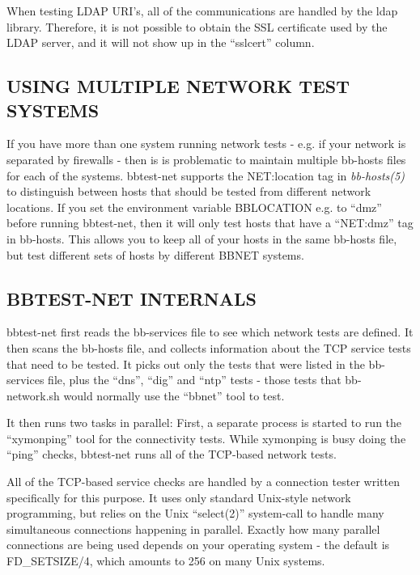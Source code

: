   When testing LDAP URI's, all of the communications are handled by
  the ldap library. Therefore, it is not possible to obtain the SSL
  certificate used by the LDAP server, and it will not show up in the
  ``sslcert'' column. 



 
\subsection{USING MULTIPLE NETWORK TEST SYSTEMS}
 If you have more than one system running network tests - e.g. if your
 network is separated by firewalls - then is is problematic to
 maintain multiple bb-hosts files for each of the systems. bbtest-net
 supports the NET:location tag in \emph{bb-hosts(5)} to distinguish
 between hosts that should be tested from different network
 locations. If you set the environment variable BBLOCATION e.g. to
 ``dmz'' before running bbtest-net, then it will only test hosts that
 have a ``NET:dmz'' tag in bb-hosts. This allows you to keep all of
 your hosts in the same bb-hosts file, but test different sets of
 hosts by different BBNET systems. 


 


 
\subsection{BBTEST-NET INTERNALS}
 bbtest-net first reads the bb-services file to see which network
 tests are defined. It then scans the bb-hosts file, and collects
 information about the TCP service tests that need to be tested. It
 picks out only the tests that were listed in the bb-services file,
 plus the ``dns'', ``dig'' and ``ntp'' tests - those tests that
 bb-network.sh would normally use the ``bbnet'' tool to test. 


  It then runs two tasks in parallel: First, a separate process is
  started to run the ``xymonping'' tool for the connectivity
  tests. While xymonping is busy doing the ``ping'' checks,
  bbtest-net runs all of the TCP-based network tests. 



  All of the TCP-based service checks are handled by a connection
  tester written specifically for this purpose. It uses only standard
  Unix-style network programming, but relies on the Unix ``select(2)''
  system-call to handle many simultaneous connections happening in
  parallel. Exactly how many parallel connections are being used
  depends on your operating system - the default is FD\_SETSIZE/4,
  which amounts to 256 on many Unix systems. 




